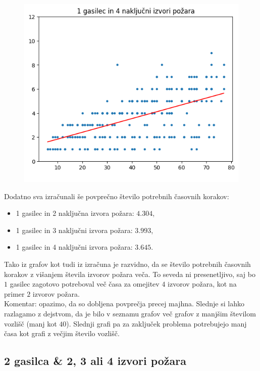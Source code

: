 \documentclass[a4paper, 12pt]{article}
\begin{document}
\begin{figure}[!htb]
    \endminipage\hfill
      \includegraphics[width=\linewidth]{plot14}
    \endminipage
\end{figure}
    
\noindent Dodatno sva izračunali še povprečno število potrebnih časovnih korakov:
\begin{itemize}
    \item 1 gasilec in 2 naključna izvora požara: $4.304$,
    \item 1 gasilec in 3 naključni izvora požara: $3.993$,
    \item 1 gasilec in 4 naključni izvora požara: $3.645$.
\end{itemize}

\noindent Tako iz grafov kot tudi iz izračuna je razvidno, da se število potrebnih časovnih korakov
z višanjem števila izvorov požara veča. To seveda ni presenetljivo, saj bo $1$ gasilec zagotovo
potreboval več časa za omejitev $4$ izvorov požara, kot na primer $2$ izvorov požara. \\

\noindent Komentar: opazimo, da so dobljena povprečja precej majhna. Slednje si lahko razlagamo z dejstvom, da je bilo v
seznamu grafov več grafov z manjšim številom vozlišč (manj kot $40$). Slednji grafi pa
za zaključek problema potrebujejo manj časa kot grafi z večjim število vozlišč. 

\subsection{2 gasilca \& 2, 3 ali 4 izvori požara}
\end{document}
